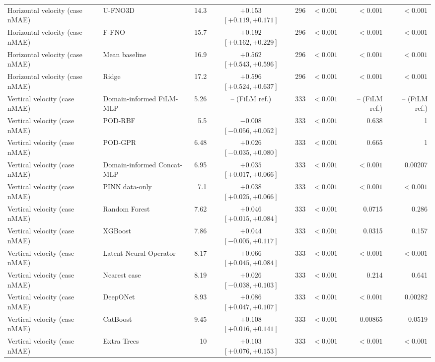 \begin{landscape}
\begin{longtable}{p{4.0cm}p{3.4cm}rcrrrr}
Horizontal velocity (case nMAE) & U-FNO3D & 14.3 & $+0.153$ $[+0.119, +0.171]$ & 296 & $< 0.001$ & $< 0.001$ & $< 0.001$ \\
Horizontal velocity (case nMAE) & F-FNO & 15.7 & $+0.192$ $[+0.162, +0.229]$ & 296 & $< 0.001$ & $< 0.001$ & $< 0.001$ \\
Horizontal velocity (case nMAE) & Mean baseline & 16.9 & $+0.562$ $[+0.543, +0.596]$ & 296 & $< 0.001$ & $< 0.001$ & $< 0.001$ \\
Horizontal velocity (case nMAE) & Ridge & 17.2 & $+0.596$ $[+0.524, +0.637]$ & 296 & $< 0.001$ & $< 0.001$ & $< 0.001$ \\
Vertical velocity (case nMAE) & Domain-informed FiLM-MLP & 5.26 & -- (FiLM ref.) & 333 & $< 0.001$ & -- (FiLM ref.) & -- (FiLM ref.) \\
Vertical velocity (case nMAE) & POD-RBF & 5.5 & $-0.008$ $[-0.056, +0.052]$ & 333 & $< 0.001$ & 0.638 & 1 \\
Vertical velocity (case nMAE) & POD-GPR & 6.48 & $+0.026$ $[-0.035, +0.080]$ & 333 & $< 0.001$ & 0.665 & 1 \\
Vertical velocity (case nMAE) & Domain-informed Concat-MLP & 6.95 & $+0.035$ $[+0.017, +0.066]$ & 333 & $< 0.001$ & $< 0.001$ & 0.00207 \\
Vertical velocity (case nMAE) & PINN data-only & 7.1 & $+0.038$ $[+0.025, +0.066]$ & 333 & $< 0.001$ & $< 0.001$ & $< 0.001$ \\
Vertical velocity (case nMAE) & Random Forest & 7.62 & $+0.046$ $[+0.015, +0.084]$ & 333 & $< 0.001$ & 0.0715 & 0.286 \\
Vertical velocity (case nMAE) & XGBoost & 7.86 & $+0.044$ $[-0.005, +0.117]$ & 333 & $< 0.001$ & 0.0315 & 0.157 \\
Vertical velocity (case nMAE) & Latent Neural Operator & 8.17 & $+0.066$ $[+0.045, +0.084]$ & 333 & $< 0.001$ & $< 0.001$ & $< 0.001$ \\
Vertical velocity (case nMAE) & Nearest case & 8.19 & $+0.026$ $[-0.038, +0.103]$ & 333 & $< 0.001$ & 0.214 & 0.641 \\
Vertical velocity (case nMAE) & DeepONet & 8.93 & $+0.086$ $[+0.047, +0.107]$ & 333 & $< 0.001$ & $< 0.001$ & 0.00282 \\
Vertical velocity (case nMAE) & CatBoost & 9.45 & $+0.108$ $[+0.016, +0.141]$ & 333 & $< 0.001$ & 0.00865 & 0.0519 \\
Vertical velocity (case nMAE) & Extra Trees & 10 & $+0.103$ $[+0.076, +0.153]$ & 333 & $< 0.001$ & $< 0.001$ & $< 0.001$ \\

\end{longtable}
\end{landscape}
